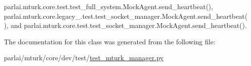 parlai.\+mturk.\+core.\+test.\+test\+\_\+full\+\_\+system.\+Mock\+Agent.\+send\+\_\+heartbeat(), parlai.\+mturk.\+core.\+legacy\+\_.\+test.\+test\+\_\+socket\+\_\+manager.\+Mock\+Agent.\+send\+\_\+heartbeat(), and parlai.\+mturk.\+core.\+test.\+test\+\_\+socket\+\_\+manager.\+Mock\+Agent.\+send\+\_\+heartbeat().



The documentation for this class was generated from the following file\+:\begin{DoxyCompactItemize}
\item 
parlai/mturk/core/dev/test/\hyperlink{dev_2test_2test__mturk__manager_8py}{test\+\_\+mturk\+\_\+manager.\+py}\end{DoxyCompactItemize}

